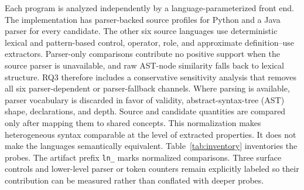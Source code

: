 \documentclass[conference]{IEEEtran}
\begin{document}
Each program is analyzed independently by a language-parameterized front end. The implementation has parser-backed source profiles for Python and a Java parser for every candidate. The other six source languages use deterministic lexical and pattern-based control, operator, role, and approximate definition--use extractors. Parser-only comparisons contribute no positive support when the source parser is unavailable, and raw AST-node similarity falls back to lexical structure. RQ3 therefore includes a conservative sensitivity analysis that removes all six parser-dependent or parser-fallback channels. Where parsing is available, parser vocabulary is discarded in favor of validity, abstract-syntax-tree (AST) shape, declarations, and depth. Source and candidate quantities are compared only after mapping them to shared concepts. This normalization makes heterogeneous syntax comparable at the level of extracted properties. It does not make the languages semantically equivalent. Table~\ref{tab:inventory} inventories the probes. The artifact prefix \texttt{ln\_} marks normalized comparisons. Three surface controls and lower-level parser or token counters remain explicitly labeled so their contribution can be measured rather than conflated with deeper probes.
\end{document}
